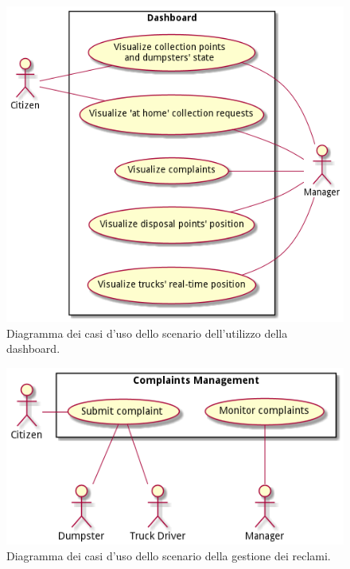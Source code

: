 \begin{figure}[H]
    \centering
    \includegraphics[width=\textwidth]{uml/dashboard-use-cases.pm}
    \caption{Diagramma dei casi d'uso dello scenario dell'utilizzo della dashboard.}
    \label{fig:uml/dashboard-use-cases}
\end{figure}


\begin{figure}[H]
    \centering
    \includegraphics[width=\textwidth]{uml/complaints-use-cases.pm}
    \caption{Diagramma dei casi d'uso dello scenario della gestione dei reclami.}
    \label{fig:uml/complaints-use-cases}
\end{figure}


